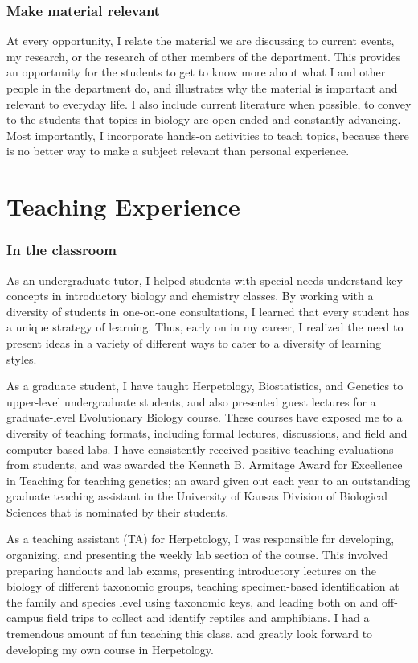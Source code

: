\documentclass[10pt]{article}
\begin{document}
\subsubsection*{Make material relevant}
At every opportunity, I relate the material we are discussing to current events, my research, or the research of other members of the department.
This provides an opportunity for the students to get to know more about what I and other people in the department do, and illustrates why the material is important and relevant to everyday life.
I also include current literature when possible, to convey to the students that topics in biology are open-ended and constantly advancing.
Most importantly, I incorporate hands-on activities to teach topics, because there is no better way to make a subject relevant than personal experience.

\section*{Teaching Experience}
\subsubsection*{In the classroom}
As an undergraduate tutor, I helped students with special needs understand key concepts in introductory biology and chemistry classes.
By working with a diversity of students in one-on-one consultations, I learned that every student has a unique strategy of learning.
Thus, early on in my career, I realized the need to present ideas in a variety of different ways to cater to a diversity of learning styles.

As a graduate student, I have taught Herpetology, Biostatistics, and Genetics to upper-level undergraduate students, and also presented guest lectures for a graduate-level Evolutionary Biology course.
These courses have exposed me to a diversity of teaching formats, including formal lectures, discussions, and field and computer-based labs.
I have consistently received positive teaching evaluations from students, and was awarded the Kenneth B. Armitage Award for Excellence in Teaching for teaching genetics; an award given out each year to an outstanding graduate teaching assistant in the University of Kansas Division of Biological Sciences that is nominated by their students.

As a teaching assistant (TA) for Herpetology, I was responsible for developing, organizing, and presenting the weekly lab section of the course.
This involved preparing handouts and lab exams, presenting introductory lectures on the biology of different taxonomic groups, teaching specimen-based identification at the family and species level using taxonomic keys, and leading both on and off-campus field trips to collect and identify reptiles and amphibians.
I had a tremendous amount of fun teaching this class, and greatly look forward to developing my own course in Herpetology.
\end{document}
